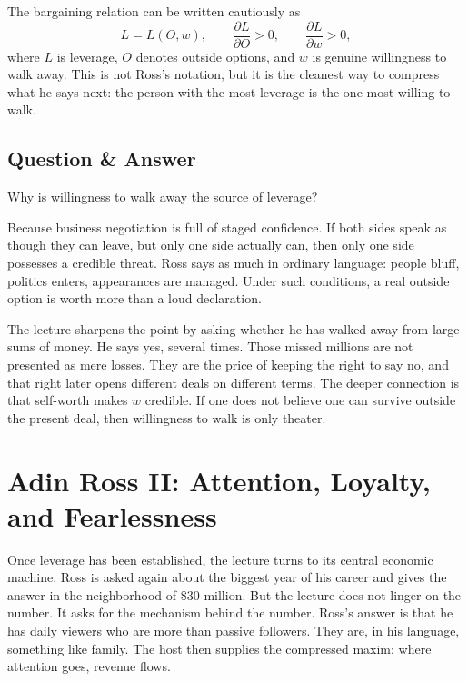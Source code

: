 The bargaining relation can be written cautiously as
\begin{equation}
L = L(O,w),\qquad \frac{\partial L}{\partial O}>0,\qquad \frac{\partial L}{\partial w}>0,
\end{equation}
where \(L\) is leverage, \(O\) denotes outside options, and \(w\) is genuine willingness to walk away. This is not Ross's notation, but it is the cleanest way to compress what he says next: the person with the most leverage is the one most willing to walk.

\subsection{Question \& Answer}

Why is willingness to walk away the source of leverage?

Because business negotiation is full of staged confidence. If both sides speak as though they can leave, but only one side actually can, then only one side possesses a credible threat. Ross says as much in ordinary language: people bluff, politics enters, appearances are managed. Under such conditions, a real outside option is worth more than a loud declaration.

The lecture sharpens the point by asking whether he has walked away from large sums of money. He says yes, several times. Those missed millions are not presented as mere losses. They are the price of keeping the right to say no, and that right later opens different deals on different terms. The deeper connection is that self-worth makes \(w\) credible. If one does not believe one can survive outside the present deal, then willingness to walk is only theater.

\section{Adin Ross II: Attention, Loyalty, and Fearlessness}

Once leverage has been established, the lecture turns to its central economic machine. Ross is asked again about the biggest year of his career and gives the answer in the neighborhood of \$30 million. But the lecture does not linger on the number. It asks for the mechanism behind the number. Ross's answer is that he has daily viewers who are more than passive followers. They are, in his language, something like family. The host then supplies the compressed maxim: where attention goes, revenue flows.

